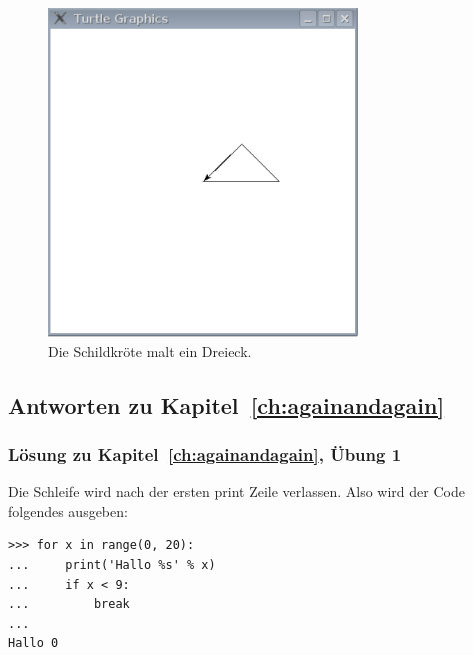 \begin{figure}
\begin{center}
\includegraphics[width=82mm]{images/figure47}
\end{center}
\caption{Die Schildkröte malt ein Dreieck.}\label{fig47}
\end{figure}

\subsection*{Antworten zu Kapitel~\ref{ch:againandagain}}

\noindent
\subsubsection{Lösung zu Kapitel~\ref{ch:againandagain}, Übung 1}
Die Schleife wird nach der ersten print Zeile verlassen. Also wird der Code folgendes ausgeben:

\begin{Verbatim}[frame=single]
>>> for x in range(0, 20):
...     print('Hallo %s' % x)
...     if x < 9:
...         break
...
Hallo 0
\end{Verbatim}

